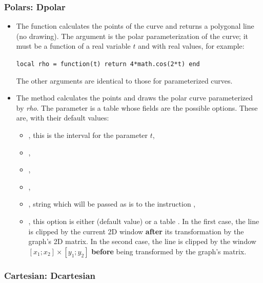 \subsubsection{Polars: Dpolar}

\begin{itemize}
    \item The function  calculates the points of the curve and returns a polygonal line (no drawing). The argument  is the polar parameterization of the curve; it must be a function of a real variable $t$ and with real values, for example:

\texttt{local rho = function(t) return 4*math.cos(2*t) end}

The other arguments are identical to those for parameterized curves.
    \item The method  calculates the points and draws the polar curve parameterized by \emph{rho}. The parameter  is a table whose fields are the possible options. These are, with their default values:

\begin{itemize}
    \item {}, this is the interval for the parameter $t$,
    \item {}, 
    \item {},
    \item {},
    \item {}, string which will be passed as is to the instruction \drawcmd,
    \item {}, this option is either \nil (default value) or a table . In the first case, the line is clipped by the current 2D window \textbf{after} its transformation by the graph's 2D matrix. In the second case, the line is clipped by the window $[x_1;x_2]\times[y_1;y_2]$ \textbf{before} being transformed by the graph's matrix.
\end{itemize}
\end{itemize}

\subsubsection{Cartesian: Dcartesian}

